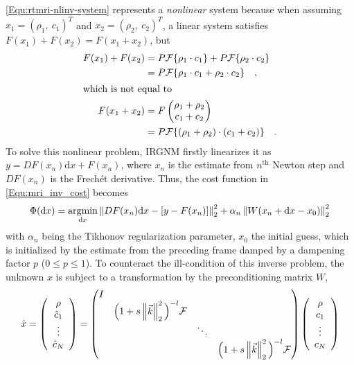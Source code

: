 \cref{Equ:rtmri-nlinv-system} represents a \textit{nonlinear} system because when assuming $x_1 = (\rho_1,~c_1)^T$ and $x_2 = (\rho_2,~c_2)^T$, a linear system satisfies $F(x_1) + F(x_2) = F(x_1 + x_2)$, but 
\begin{align*}
  F(x_1) + F(x_2) 
  &= P \mathcal{F} \{ \rho_1 \cdot c_1 \} + P \mathcal{F} \{ \rho_2 \cdot c_2 \} \\
  &= P \mathcal{F} \{ \rho_1 \cdot c_1 + \rho_2 \cdot c_2 \} \quad , \\
\intertext{which is not equal to} 
  F(x_1 + x_2) 
  &= F \begin{pmatrix}
    \rho_1 + \rho_2 \\
    c_1 + c_2
  \end{pmatrix} \\
  &= P \mathcal{F} \{ (\rho_1 + \rho_2) \cdot (c_1 + c_2) \} \quad .
\end{align*} 
To solve this nonlinear problem, IRGNM firstly linearizes it as $y = DF(x_n) \text{d}x + F(x_n)$, where $x_n$ is the estimate from $n^{\text{th}}$ Newton step and $DF(x_n)$ is the Frech\'et derivative. Thus, the cost function in \cref{Equ:mri_inv_cost} becomes 
\begin{equation} \label{Equ:rtmri-nlinv-cost}
  \Phi(\text{d}x) = \operatorname*{\arg\!\min}\limits_{\text{d}x} \left\lVert DF(x_n)\text{d}x - [y - F(x_n)]\right\rVert_2^2 + \alpha_n \left\lVert W ( x_n + \text{d}x - x_0 )\right\rVert_2^2
\end{equation}
with $\alpha_n$ being the Tikhonov regularization parameter, $x_0$ the initial guess, which is initialized by the estimate from the preceding frame damped by a dampening factor $p$ ($0 \leq p \leq 1$). To counteract the ill-condition of this inverse problem, the unknown $x$ is subject to a transformation by the preconditioning matrix $W$, 
\begin{equation} \label{Equ:rtmri-nlinv-W}
  \hat{x} = 
  \left( \begin{array}{c}
    \rho \\
    \hat{c}_1 \\
    \vdots \\
    \hat{c}_N \\
  \end{array} \right) = 
  \begin{pmatrix}
    I &                                             &        & \\
      & \Big( 1 + s \left\lVert\vec{k}\right\rVert_2^2 \Big)^{-l} \mathcal{F} &        & \\
      &                                             & \ddots & \\
      &                                             &        & \Big( 1 + s \left\lVert\vec{k}\right\rVert_2^2 \Big)^{-l} \mathcal{F}
  \end{pmatrix} 
  \left( \begin{array}{c}
    \rho \\
    c_1 \\
    \vdots \\
    c_N \\
  \end{array} \right)
\end{equation}
